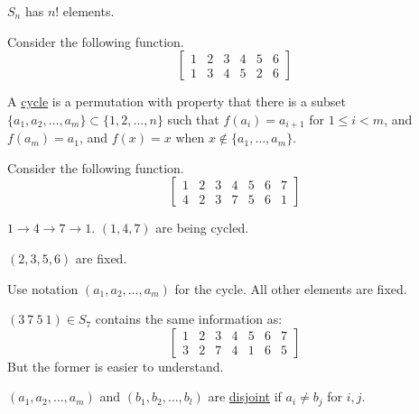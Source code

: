 \documentclass[11pt]{scrartcl}
\begin{document}
\begin{note}
  $S_n$ has $n!$ elements.
\end{note}
\begin{example}
  Consider the following function.
  \[
    \begin{bmatrix}
      1 & 2 & 3 & 4 & 5 & 6 \\
      1 & 3 & 4 & 5 & 2 & 6
    \end{bmatrix}
  \]
\end{example}

\begin{definition}
  A \ul{cycle} is a permutation with property that there is a subset $\{a_1, a_2, \dots, a_m\} \subset \{1, 2, \dots, n\}$ such that $f(a_i) = a_{i + 1}$ for $1 \leq i < m$, and $f(a_m) = a_1$, and $f(x) = x$ when $x \notin \{a_1, \dots, a_m\}$.
\end{definition}

\begin{example}
  Consider the following function.
  \[
    \begin{bmatrix}
      1 & 2 & 3 & 4 & 5 & 6 & 7 \\
      4 & 2 & 3 & 7 & 5 & 6 & 1
    \end{bmatrix}
  \]
  
  $1 \to 4 \to 7 \to 1$. \quad $(1, 4, 7)$ are being cycled.

  $(2, 3, 5, 6)$ are fixed.
\end{example}

\begin{note}
  Use notation $(a_1, a_2, \dots, a_m)$ for the cycle. All other elements are fixed.
\end{note}

\begin{example}
  $(3 \ 7 \ 5 \ 1) \in S_7$ contains the same information as:
  \[
    \begin{bmatrix}
      1 & 2 & 3 & 4 & 5 & 6 & 7 \\
      3 & 2 & 7 & 4 & 1 & 6 & 5
    \end{bmatrix}
  \]
  But the former is easier to understand.
\end{example}

\begin{note}
  $(a_1, a_2, \dots, a_m)$ and $(b_1, b_2, \dots, b_l)$ are \ul{disjoint} if $a_i \neq b_j$ for $i, j$.
\end{note}
\end{document}
